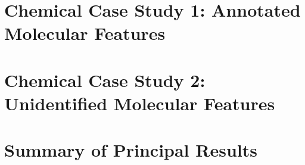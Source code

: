   \section{Chemical Case Study 1: Annotated Molecular Features}\label{sec:annotated-features}

  \section{Chemical Case Study 2: Unidentified Molecular Features}\label{sec:unidentified-features}

  \section{Summary of Principal Results}\label{sec:principal-results}
